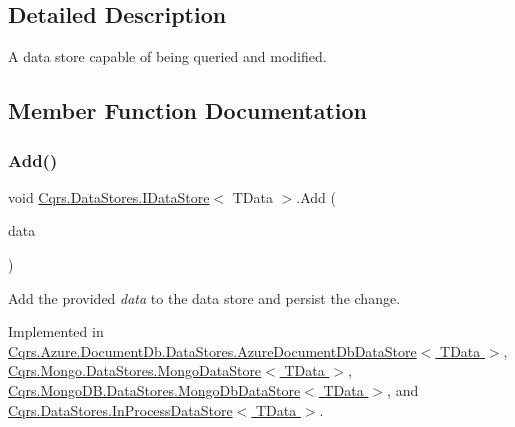 \subsection{Detailed Description}
A data store capable of being queried and modified. 



\subsection{Member Function Documentation}
\mbox{\label{interfaceCqrs_1_1DataStores_1_1IDataStore_a114404daaf37fec9cc5547cd9a17858c_a114404daaf37fec9cc5547cd9a17858c}} 
\subsubsection{\texorpdfstring{Add()}{Add()}\hspace{0.1cm}{\footnotesize\ttfamily [1/2]}}
{\footnotesize\ttfamily void \hyperlink{interfaceCqrs_1_1DataStores_1_1IDataStore}{Cqrs.\+Data\+Stores.\+I\+Data\+Store}$<$ T\+Data $>$.Add (\begin{DoxyParamCaption}\item[{T\+Data}]{data }\end{DoxyParamCaption})}



Add the provided {\itshape data}  to the data store and persist the change. 



Implemented in \hyperlink{classCqrs_1_1Azure_1_1DocumentDb_1_1DataStores_1_1AzureDocumentDbDataStore_ad17e6e846430e617af24be48b77d1528_ad17e6e846430e617af24be48b77d1528}{Cqrs.\+Azure.\+Document\+Db.\+Data\+Stores.\+Azure\+Document\+Db\+Data\+Store$<$ T\+Data $>$}, \hyperlink{classCqrs_1_1Mongo_1_1DataStores_1_1MongoDataStore_a27bcfb40fe8203e09d320b2aa19fff3a_a27bcfb40fe8203e09d320b2aa19fff3a}{Cqrs.\+Mongo.\+Data\+Stores.\+Mongo\+Data\+Store$<$ T\+Data $>$}, \hyperlink{classCqrs_1_1MongoDB_1_1DataStores_1_1MongoDbDataStore_affcb1268469b99963501dd8c58e4a480_affcb1268469b99963501dd8c58e4a480}{Cqrs.\+Mongo\+D\+B.\+Data\+Stores.\+Mongo\+Db\+Data\+Store$<$ T\+Data $>$}, and \hyperlink{classCqrs_1_1DataStores_1_1InProcessDataStore_ade5c4033c628598665c0cba986a54c15_ade5c4033c628598665c0cba986a54c15}{Cqrs.\+Data\+Stores.\+In\+Process\+Data\+Store$<$ T\+Data $>$}.


